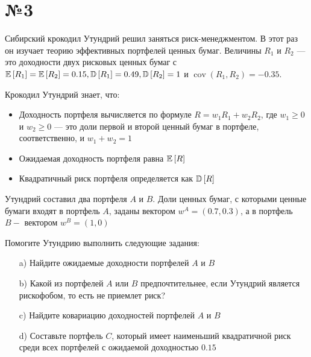 \documentclass{article}
\begin{document}
\section*{№3}
\begin{tcolorbox}[colback=blue!20!white, colframe=black!100!black]
    Сибирский крокодил Утундрий решил заняться риск-менеджментом. В этот раз он изучает теорию эффективных портфелей ценных бумаг. Величины $R_1$ и $R_2$ — это доходности двух рисковых ценных бумаг с $\mathbb{E}\left[R_1\right]=\mathbb{E}\left[R_2\right]=0.15, \mathbb{D}\left[R_1\right]=0.49, \mathbb{D}\left[R_2\right]=1$ и $\operatorname{cov}\left(R_1, R_2\right)=-0.35$.
    
    Крокодил Утундрий знает, что:
    \begin{itemize}
        \item Доходность портфеля вычисляется по формуле $R=w_1 R_1+w_2 R_2$, где $w_1 \geqslant 0$ и $w_2 \geqslant 0$ — это доли первой и второй ценный бумаг в портфеле, соответственно, и $w_1+w_2=1$
        \item Ожидаемая доходность портфеля равна $\mathbb{E}\left[R\right]$
        \item Квадратичный риск портфеля определяется как $\mathbb{D}\left[R\right]$
    \end{itemize}
    Утундрий составил два портфеля $A$ и $B$. Доли ценных бумаг, с которыми ценные бумаги входят в портфель $A$, заданы вектором $w^A=(0.7,0.3)$, а в портфель $B-$ вектором $w^B=(1,0)$

    Помогите Утундрию выполнить следующие задания:
    \begin{enumerate}
        \item[a)] Найдите ожидаемые доходности портфелей $A$ и $B$
        \item[b)] Какой из портфелей $A$ или $B$ предпочтительнее, если Утундрий является рискофобом, то есть не приемлет риск?
        \item[c)] Найдите ковариацию доходностей портфелей $A$ и $B$
        \item[d)] Составьте портфель $C$, который имеет наименьший квадратичной риск среди всех портфелей с ожидаемой доходностью $0.15$   
    \end{enumerate}
\end{tcolorbox}
\end{document}
